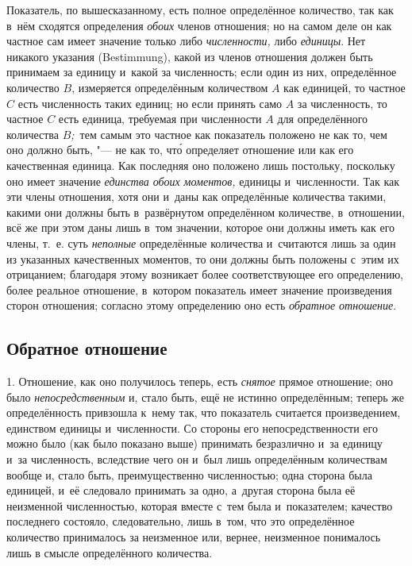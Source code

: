 Показатель, по вышесказанному, есть полное определённое количество, так как
в~нём сходятся определения {\em обоих} членов отношения; но на самом деле он
как частное сам имеет значение только либо {\em численности,} либо
{\em единицы}. Нет никакого указания (Bestimmung), какой из членов отношения
должен быть принимаем за единицу и~какой за численность; если один из них,
определённое количество $B$, измеряется определённым количеством $A$ как
единицей, то частное $C$ есть численность таких единиц; но если принять само
$A$ за численность, то частное $C$ есть единица, требуемая при численности $A$
для определённого количества $B${\em ;\,} тем самым это частное как показатель
положено не как то, чем оно должно быть, "--- не как то, чт\'{о} определяет
отношение или как его качественная единица. Как последняя оно положено лишь
постольку, поскольку оно имеет значение {\em единства обоих моментов,} единицы
и~численности. Так как эти члены отношения, хотя они и~даны как определённые
количества такими, какими они должны быть в~развёрнутом определённом
количестве, в~отношении, всё же при этом даны лишь в~том значении, которое они
должны иметь как его члены, т.~е. суть {\em неполные} определённые количества
и~считаются лишь за один из указанных качественных моментов, то они должны быть
положены с~этим их отрицанием; благодаря этому возникает более соответствующее
его определению, более реальное отношение, в~котором показатель имеет значение
произведения сторон отношения; согласно этому определению оно есть
{\em обратное отношение}.

\subsection{Обратное отношение}

1. Отношение, как оно получилось теперь, есть {\em снятое} прямое отношение;
оно было {\em непосредственным} и, стало быть, ещё не истинно определённым;
теперь же определённость привзошла к~нему так, что показатель считается
произведением, единством единицы и~численности. Со стороны его
непосредственности его можно было (как было показано выше) принимать
безразлично и~за единицу и~за численность, вследствие чего он и~был лишь
определённым количествам вообще и, стало быть, преимущественно численностью;
одна сторона была единицей, и~её следовало принимать за одно, а~другая сторона
была её неизменной численностью, которая вместе с~тем была и~показателем;
качество последнего состояло, следовательно, лишь в~том, что это определённое
количество принималось за неизменное или, вернее, неизменное понималось лишь в
смысле определённого количества.


